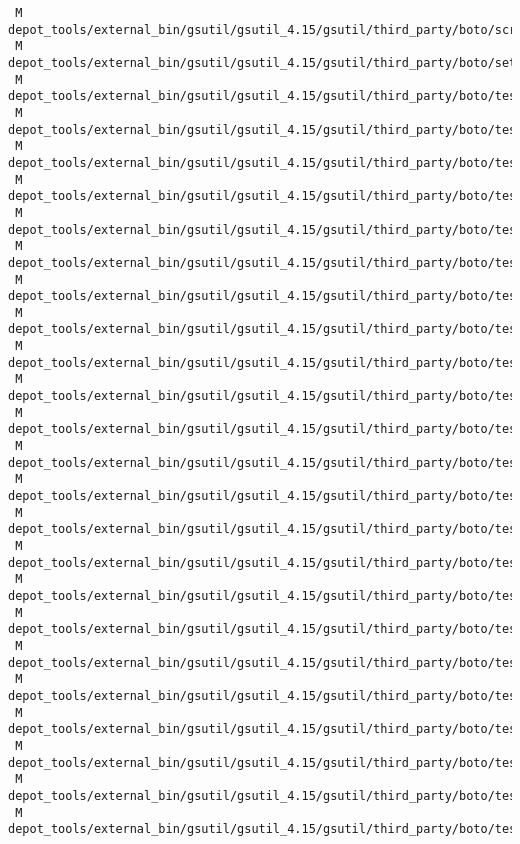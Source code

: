 \documentclass{article}
\begin{document}
\begin{verbatim}
 M depot_tools/external_bin/gsutil/gsutil_4.15/gsutil/third_party/boto/scripts/rebuild_endpoints.py
 M depot_tools/external_bin/gsutil/gsutil_4.15/gsutil/third_party/boto/setup.py
 M depot_tools/external_bin/gsutil/gsutil_4.15/gsutil/third_party/boto/tests/db/test_lists.py
 M depot_tools/external_bin/gsutil/gsutil_4.15/gsutil/third_party/boto/tests/db/test_password.py
 M depot_tools/external_bin/gsutil/gsutil_4.15/gsutil/third_party/boto/tests/db/test_query.py
 M depot_tools/external_bin/gsutil/gsutil_4.15/gsutil/third_party/boto/tests/db/test_sequence.py
 M depot_tools/external_bin/gsutil/gsutil_4.15/gsutil/third_party/boto/tests/devpay/test_s3.py
 M depot_tools/external_bin/gsutil/gsutil_4.15/gsutil/third_party/boto/tests/fps/test.py
 M depot_tools/external_bin/gsutil/gsutil_4.15/gsutil/third_party/boto/tests/integration/cloudformation/test_connection.py
 M depot_tools/external_bin/gsutil/gsutil_4.15/gsutil/third_party/boto/tests/integration/ec2/autoscale/test_connection.py
 M depot_tools/external_bin/gsutil/gsutil_4.15/gsutil/third_party/boto/tests/integration/ec2/cloudwatch/test_connection.py
 M depot_tools/external_bin/gsutil/gsutil_4.15/gsutil/third_party/boto/tests/integration/ec2/test_connection.py
 M depot_tools/external_bin/gsutil/gsutil_4.15/gsutil/third_party/boto/tests/integration/gs/test_basic.py
 M depot_tools/external_bin/gsutil/gsutil_4.15/gsutil/third_party/boto/tests/integration/gs/test_generation_conditionals.py
 M depot_tools/external_bin/gsutil/gsutil_4.15/gsutil/third_party/boto/tests/integration/gs/test_resumable_downloads.py
 M depot_tools/external_bin/gsutil/gsutil_4.15/gsutil/third_party/boto/tests/integration/gs/test_resumable_uploads.py
 M depot_tools/external_bin/gsutil/gsutil_4.15/gsutil/third_party/boto/tests/integration/gs/test_storage_uri.py
 M depot_tools/external_bin/gsutil/gsutil_4.15/gsutil/third_party/boto/tests/integration/gs/test_versioning.py
 M depot_tools/external_bin/gsutil/gsutil_4.15/gsutil/third_party/boto/tests/integration/gs/util.py
 M depot_tools/external_bin/gsutil/gsutil_4.15/gsutil/third_party/boto/tests/integration/mws/test.py
 M depot_tools/external_bin/gsutil/gsutil_4.15/gsutil/third_party/boto/tests/integration/rds/test_db_subnet_group.py
 M depot_tools/external_bin/gsutil/gsutil_4.15/gsutil/third_party/boto/tests/integration/rds/test_promote_modify.py
 M depot_tools/external_bin/gsutil/gsutil_4.15/gsutil/third_party/boto/tests/integration/route53/test_health_check.py
 M depot_tools/external_bin/gsutil/gsutil_4.15/gsutil/third_party/boto/tests/integration/route53/test_zone.py
 M depot_tools/external_bin/gsutil/gsutil_4.15/gsutil/third_party/boto/tests/integration/s3/test_bucket.py

\end{verbatim}
\end{document}

